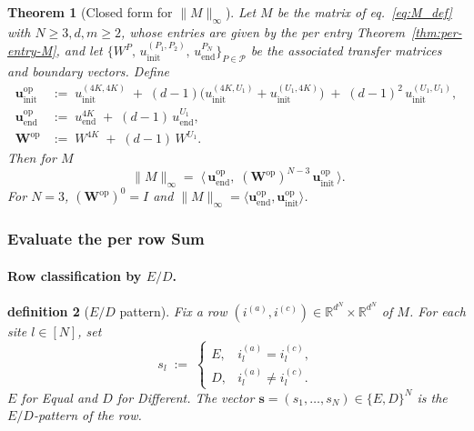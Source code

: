 \documentclass[12pt,a4paper]{article}
\newtheorem{theorem}{Theorem}[section]
\newtheorem{definition}[theorem]{definition}
\newcommand{\R}{\mathbb{R}}
\begin{document}
\begin{theorem}[Closed form for $\|M\|_\infty$]\label{thm:opnorm-closed}
Let $M$ be the matrix of eq.~\eqref{eq:M_def} with $N\ge 3, d,m\ge 2$,  whose entries are
given by the per entry Theorem~\ref{thm:per-entry-M}, and let $\{W^{P},\,u^{(P_1,P_2)}_{\mathrm{init}},\,u^{P_N}_{\mathrm{end}}\}_{P\in\mathcal{P}}$ be the associated transfer matrices and boundary vectors. 
Define 
\begin{align}
\mathbf{u}^{\mathrm{op}}_{\mathrm{init}}
&:=\;u^{(4K,4K)}_{\mathrm{init}}
\;+\;(d-1)\bigl(u^{(4K,U_1)}_{\mathrm{init}}+u^{(U_1,4K)}_{\mathrm{init}}\bigr)
\;+\;(d-1)^{2}\,u^{(U_1,U_1)}_{\mathrm{init}},\\[2pt]
\mathbf{u}^{\mathrm{op}}_{\mathrm{end}}
&:=\;u^{4K}_{\mathrm{end}}\;+\;(d-1)\,u^{U_1}_{\mathrm{end}},\\[2pt]
\mathbf{W}^{\mathrm{op}}
&:=\;W^{4K}\;+\;(d-1)\,W^{U_1}.
\end{align}
Then for $M$
\begin{equation}\label{eq:opnorm_formula}
\;\|M\|_{\infty}
=\;\bigl\langle\,\mathbf{u}^{\mathrm{op}}_{\mathrm{end}},\;
(\mathbf{W}^{\mathrm{op}})^{N-3}\,\mathbf{u}^{\mathrm{op}}_{\mathrm{init}}\,\bigr\rangle .
\end{equation}
For $N=3$, $(\mathbf{W}^{\mathrm{op}})^{0}=I$ and
$\|M\|_\infty=\langle\mathbf{u}^{\mathrm{op}}_{\mathrm{end}},\mathbf{u}^{\mathrm{op}}_{\mathrm{init}}\rangle$.
\end{theorem}
\subsubsection{Evaluate the per row Sum}
\paragraph{Row classification by $E/D$.}
\begin{definition}[$E/D$ pattern]\label{def:E_D_sites}
Fix a row $(i^{(a)}, i^{(c)})\in\R^{d^N}\times\R^{d^N}$ of $M$. For each site $l\in[N]$, set
\begin{equation}
s_l \;:=\; \begin{cases} E, & i_l^{(a)} = i_l^{(c)},\\ D, & i_l^{(a)} \neq i_l^{(c)}. \end{cases}
\end{equation}
$E$  for Equal and $D$  for Different.
The vector $\mathbf{s} = (s_1,\dots,s_N)\in\{E,D\}^N$ is the \emph{$E/D$-pattern} of the row.
\end{definition}
\end{document}
